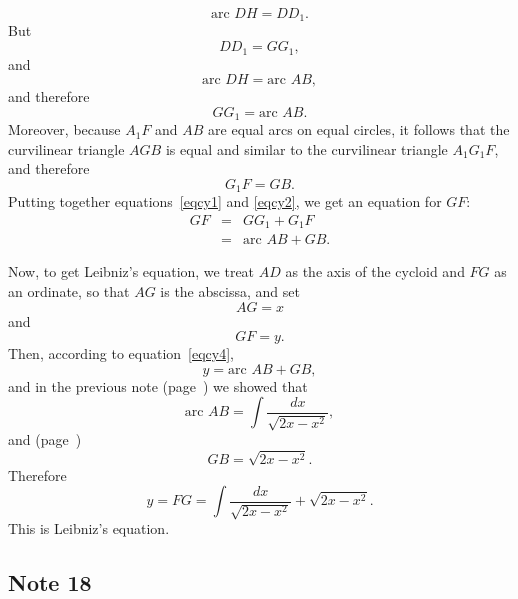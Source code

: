 \documentclass[polutonikogreek,english,twoside,openright]{article}
\begin{document}
$$\mbox{arc }DH = DD_1.$$
But 
$$DD_1 = GG_1,$$
and 
$$\mbox{arc }DH = \mbox{arc }AB,$$
and therefore
\begin{equation}
GG_1 = \mbox{arc }AB.\label{eqcy1}
\end{equation}
Moreover, because $A_1F$ and $AB$ are equal arcs on equal circles, it
follows that the curvilinear triangle $AGB$ is equal and similar to
the curvilinear triangle $A_1G_1F$, and therefore
\begin{equation}
G_1F = GB.\label{eqcy2}
\end{equation}
Putting together equations~\ref{eqcy1} and \ref{eqcy2}, we get an equation for $GF$:
\begin{eqnarray}
GF & = & GG_1 + G_1F\label{eqcy3}\\
& = & \mbox{arc }AB + GB.\label{eqcy4}
\end{eqnarray}

Now, to get Leibniz's equation, we treat $AD$ as the axis of the
cycloid and $FG$ as an ordinate, so that $AG$ is the abscissa, and set
$$AG = x$$ and
$$GF =y.$$
Then, according to equation~\ref{eqcy4},
$$y = \mbox{arc }AB + GB,$$
and in the previous note (page~\pageref{ecircarc}) we showed that 
$$\mbox{arc }AB = \int\!\frac{dx}{\sqrt{2x -x^2}},$$
and (page~\pageref{sinelength})
$$GB = \sqrt{2x-x^2}.$$
Therefore
$$y = FG = \int\!\frac{dx}{\sqrt{2x -x^2}} + \sqrt{2x-x^2}.$$
This is Leibniz's equation. \label{ecycloid}

\subsection*{Note 18}
\label{crg18}
\end{document}
